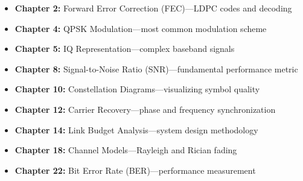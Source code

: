 \begin{itemize}
\item \textbf{Chapter 2:} Forward Error Correction (FEC)---LDPC codes and decoding
\item \textbf{Chapter 4:} QPSK Modulation---most common modulation scheme
\item \textbf{Chapter 5:} IQ Representation---complex baseband signals
\item \textbf{Chapter 8:} Signal-to-Noise Ratio (SNR)---fundamental performance metric
\item \textbf{Chapter 10:} Constellation Diagrams---visualizing symbol quality
\item \textbf{Chapter 12:} Carrier Recovery---phase and frequency synchronization
\item \textbf{Chapter 14:} Link Budget Analysis---system design methodology
\item \textbf{Chapter 18:} Channel Models---Rayleigh and Rician fading
\item \textbf{Chapter 22:} Bit Error Rate (BER)---performance measurement
\end{itemize}
